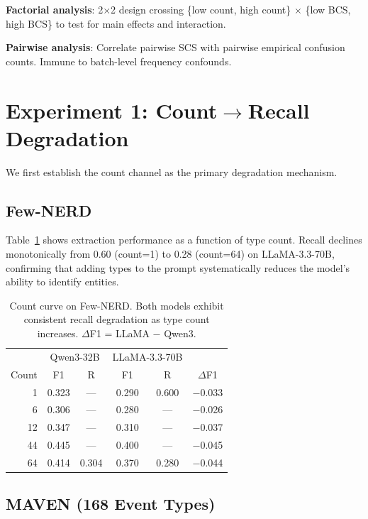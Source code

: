 \documentclass[11pt,a4paper]{article}
\begin{document}
\textbf{Factorial analysis}: 2$\times$2 design crossing \{low count, high count\} $\times$ \{low BCS, high BCS\} to test for main effects and interaction.

\textbf{Pairwise analysis}: Correlate pairwise SCS with pairwise empirical confusion counts. Immune to batch-level frequency confounds.

\section{Experiment 1: Count$\to$Recall Degradation}

We first establish the count channel as the primary degradation mechanism.

\subsection{Few-NERD}

Table~\ref{tab:fewnerd_count} shows extraction performance as a function of type count.
Recall declines monotonically from 0.60 (count=1) to 0.28 (count=64) on LLaMA-3.3-70B, confirming that adding types to the prompt systematically reduces the model's ability to identify entities.

\begin{table}[h]
\centering
\small
\begin{tabular}{r|cc|cc|c}
\toprule
& \multicolumn{2}{c|}{Qwen3-32B} & \multicolumn{2}{c|}{LLaMA-3.3-70B} & \\
Count & F1 & R & F1 & R & $\Delta$F1 \\
\midrule
1  & 0.323 & --- & 0.290 & 0.600 & $-$0.033 \\
6  & 0.306 & --- & 0.280 & --- & $-$0.026 \\
12 & 0.347 & --- & 0.310 & --- & $-$0.037 \\
44 & 0.445 & --- & 0.400 & --- & $-$0.045 \\
64 & 0.414 & 0.304 & 0.370 & 0.280 & $-$0.044 \\
\bottomrule
\end{tabular}
\caption{Count curve on Few-NERD. Both models exhibit consistent recall degradation as type count increases. $\Delta$F1 = LLaMA $-$ Qwen3.}
\label{tab:fewnerd_count}
\end{table}

\subsection{MAVEN (168 Event Types)}
\end{document}
